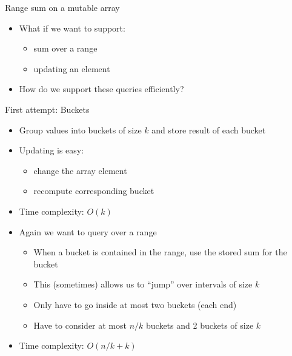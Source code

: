 \documentclass{beamer}
\begin{document}
\begin{frame}[plain]{Range sum on a mutable array}
    \begin{itemize}
        \item<1-> What if we want to support:
        \begin{itemize}
            \item<2-> sum over a range
            \item<3-> updating an element
        \end{itemize}
        \item<4-> How do we support these queries efficiently?
    \end{itemize}
\end{frame}

\begin{frame}[plain]{First attempt: Buckets}
    \begin{itemize}
        \item<1-> Group values into buckets of size $k$ and store result of each bucket
        \item<2-> Updating is easy:
        \begin{itemize}
            \item<3-> change the array element
            \item<4-> recompute corresponding bucket
        \end{itemize}
        \item<5-> Time complexity: $O(k)$
        \item<6-> Again we want to query over a range
        \begin{itemize}
            \item<7-> When a bucket is contained in the range, use the stored sum for the bucket
            \item<8-> This (sometimes) allows us to ``jump'' over intervals of size $k$
            \item<9-> Only have to go inside at most two buckets (each end)
            \item<10-> Have to consider at most $n/k$ buckets and 2 buckets of size $k$
        \end{itemize}
        \item<11-> Time complexity: $O(n/k + k)$
    \end{itemize}
\end{frame}
\end{document}
